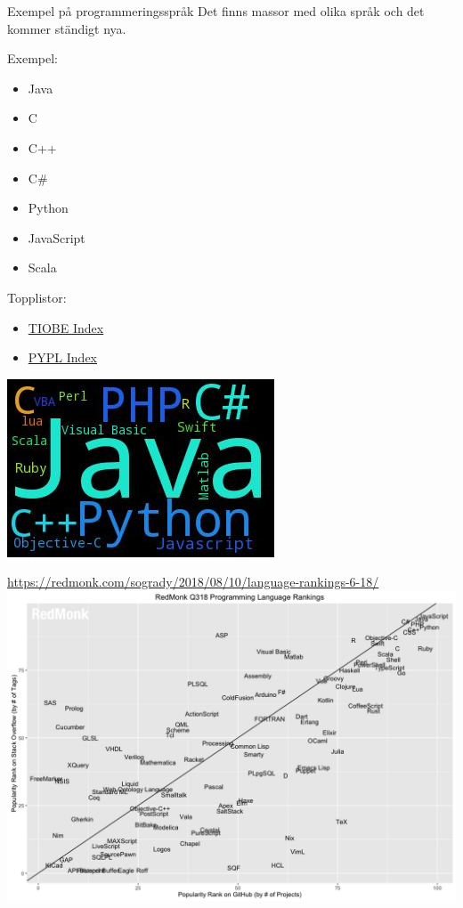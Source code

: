 \begin{Slide}{Exempel på programmeringsspråk}
Det finns massor med olika språk och det kommer ständigt nya.
\vspace{1em}
\begin{multicols}{2}
Exempel:
\begin{itemize}
\item Java
\item C
\item C++
\item C\#
\item Python
\item JavaScript
\item Scala
\end{itemize}

\columnbreak %

Topplistor:
\begin{itemize}
\item \href{http://www.tiobe.com/index.php/content/paperinfo/tpci/index.html}{TIOBE Index}
\item \href{http://pypl.github.io/PYPL.html}{PYPL Index}
\end{itemize}
\vspace{1em}
\includegraphics[width=0.8\columnwidth]{../img/pypl}\\\SlideFontSmall{[PYPL (2016)]}
\end{multicols}

\end{Slide}

\begin{Slide}{\footnotesize\url{https://redmonk.com/sogrady/2018/08/10/language-rankings-6-18/}}
\includegraphics[width=0.95\columnwidth]{../img/redmonk-Q318}
\end{Slide}


